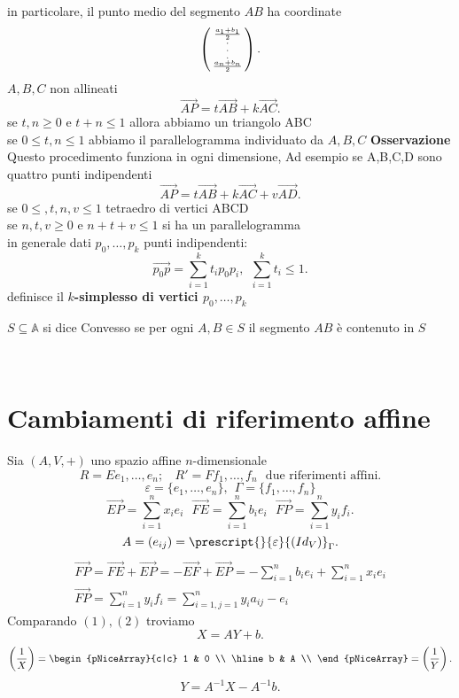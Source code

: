 \documentclass[12px]{article}
\begin{document}
	in particolare, il punto medio del segmento $AB$ ha coordinate
	\[
		\left(\begin{smallmatrix}\frac{a_1+b_1}{2}\\.\\.\\.\\\frac{a_n + b_n}{2}\end{smallmatrix}\right)
	.\] 
	$A,B,C$ non allineati
	\[
	\overrightarrow{AP} = t\overrightarrow{AB} + k\overrightarrow{AC}
	.\] 
	se $t,n \geq 0$ e $t + n\leq 1$ allora abbiamo un triangolo ABC\\
	se $0\leq t,n \leq 1$ abbiamo il parallelogramma individuato da $A,B,C$\newpage
	\textbf{Osservazione}\\
	Questo procedimento funziona in ogni dimensione, Ad esempio se A,B,C,D sono quattro punti indipendenti
	\[
	\overrightarrow{AP} = t\overrightarrow{AB} + k\overrightarrow{AC} + v\overrightarrow{AD}
	.\] 
	se $0\leq,t,n,v\leq 1$ tetraedro di vertici ABCD\\
	se $n,t,v\geq 0$ e $n+t+v\leq 1$ si ha un parallelogramma\\
	in generale dati $p_0,\ldots,p_k$ punti indipendenti:\\
	\[
	\overrightarrow{p_0p} = \sum^k_{i=1}t_ip_0p_i, \ \ \sum^k_{i=1}t_i \leq 1
	.\] 
	definisce il \textbf{$k$-simplesso di vertici $p_0,\ldots,p_k$}\\
	\begin{defi}
	$S\subseteq \mathbb{A} $ si dice Convesso se per ogni $A,B\in S$ il segmento $AB$ è contenuto in $S$
\end{defi}
\
\section{Cambiamenti di riferimento affine}
Sia $(A,V,+)$ uno spazio affine $n$-dimensionale
\[
	R = Ee_1,\ldots,e_n;\ \ \ \ R'= Ff_1,\ldots,f_n \ \ \ \text{due riferimenti affini}
.\] 
\[
	\varepsilon = \{e_1,\ldots,e_n\}, \ \ \Gamma = \{f_1,\ldots,f_n\}
\]
\[
\overrightarrow{EP} = \sum^n_{i=1}x_ie_i\ \ \ \overrightarrow{FE} = \sum^n_{i=1}b_ie_i \ \ \ \overrightarrow{FP} = \sum^n_{i=1}y_if_i
.\] 
\[
	A = (e_{ij}) = \prescript{}{\varepsilon}{(Id_V)}_\Gamma
.\] 
\begin{gather}
\overrightarrow{FP} = \overrightarrow{FE} + \overrightarrow{EP} = -\overrightarrow{EF} + \overrightarrow{EP} = -\sum^n_{i=1}b_ie_i + \sum^n_{i=1}x_ie_i\\
\overrightarrow{FP} = \sum^n_{i=1}y_if_i = \sum^n_{i=1, j=1}y_ia_{ij}-e_i
\end{gather}
Comparando $(1),(2)$ troviamo \[
X = AY + b
.\] 
\[
	\left(\frac{1}{X}\right) = \begin{pNiceArray}{c|c}
		1 & 0 \\
		\hline
		b & A \\ 
	\end{pNiceArray} = \left(\frac{1}{Y}\right)
.\] 
\[
	Y = A^{-1}X - A^{-1}b
.\] 
\end{document}

